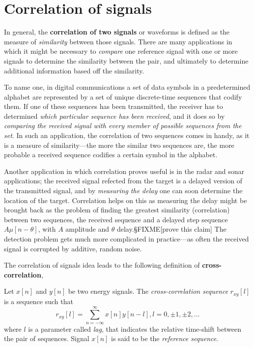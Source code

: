 \documentclass[\documentfontsize, twocolumn]{\classname}
\begin{document}
\section{Correlation of signals}

In general, the \textbf{correlation of two signals} or waveforms is defined as the measure of \emph{similarity} between those signals. There are many applications in which it might be necessary to \emph{compare} one reference signal with one or more signals to determine the similarity between the pair, and ultimately to determine additional information based off the similarity. 

To name one, in digital communications a set of data symbols in a predetermined alphabet are represented by a set of unique discrete-time sequences that codify them. If one of these sequences has been transmitted, the receiver has to determined \emph{which particular sequence has been received}, and it does so by \emph{comparing the received signal with every member of possible sequences from the set}. In such an application, the correlation of two sequences comes in handy, as it is a measure of similarity---the more the similar two sequences are, the more probable a received sequence codifies a certain symbol in the alphabet.

Another application in which correlation proves useful is in the radar and sonar applications; the received signal refected from the target is a delayed version of the transmitted signal, and by \emph{measuring the delay} one can soon determine the location of the target. Correlation helps on this as measuring the delay might be brought back as the problem of finding the greatest similarity (correlation) between two sequences, the received sequence and a delayed step sequence $A\mu[n-\theta]$, with $A$ amplitude and $\theta$ delay.§FIXME[prove this claim] The detection problem gets much more complicated in practice---as often the received signal is corrupted by additive, random noise.

The correlation of signals idea leads to the following definition of \textbf{cross-correlation},
\begin{defin}
    Let $x[n]$ and $y[n]$ be two energy signals. The \emph{cross-correlation sequence} $r_{xy}[l]$ is a sequence such that
    \begin{equation}\label{eqn:crossCorrelation}
        r_{xy}[l] = \sum_{n=-\infty}^\infty x[n]y[n-l], l = 0, \pm 1, \pm 2, \dots
    \end{equation}
    where $l$ is a parameter called \emph{lag}, that indicates the relative time-shift between the pair of sequences. Signal $x[n]$ is said to be the \emph{reference sequence}.
\end{defin}
\end{document}
